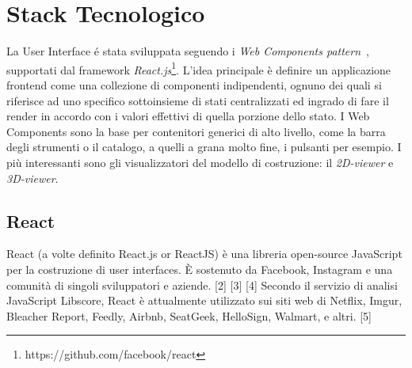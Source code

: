 \section{Stack Tecnologico}
\label{sec:chapter_2_section_3}

La User Interface \'e stata sviluppata seguendo i \emph{Web Components pattern}~\cite{web_components},
supportati dal framework \emph{React.js}\footnote{https://github.com/facebook/react}.
L'idea principale \`e definire un applicazione frontend come una collezione di componenti indipendenti,
ognuno dei quali si riferisce ad uno specifico sottoinsieme di stati centralizzati ed ingrado
di fare il render in accordo con i valori effettivi di quella porzione dello stato.
I Web Components sono la base per contenitori generici di alto livello, come la barra degli strumenti o il catalogo,
a quelli a grana molto fine, i pulsanti per esempio. I più interessanti sono gli visualizzatori del
modello di costruzione: il \emph{2D-viewer} e \emph{3D-viewer}.

%
\subsection{React}
React (a volte definito React.js or ReactJS) \`e una libreria open-source JavaScript per la costruzione di user interfaces.
\`E sostenuto da Facebook, Instagram e una comunità di singoli sviluppatori e aziende.
[2] [3] [4] Secondo il servizio di analisi JavaScript Libscore, React è attualmente utilizzato sui
 siti web di Netflix, Imgur, Bleacher Report, Feedly, Airbnb, SeatGeek, HelloSign, Walmart, e altri. [5]


